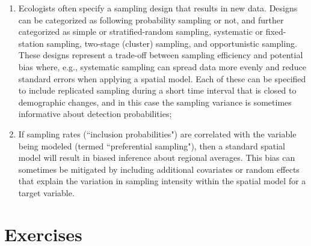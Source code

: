 \begin{enumerate}
    \item Ecologists often specify a sampling design that results in new data. Designs can be categorized as following probability sampling or not, and further categorized as simple or stratified-random sampling, systematic or fixed-station sampling, two-stage (cluster) sampling, and opportunistic sampling.  These designs represent a trade-off between sampling efficiency and potential bias where, e.g., systematic sampling can spread data more evenly and reduce standard errors when applying a spatial model.  Each of these can be specified to include replicated sampling during a short time interval that is closed to demographic changes, and in this case the sampling variance is sometimes informative about detection probabilities;

    \item If sampling rates (``inclusion probabilities") are correlated with the variable being modeled (termed ``preferential sampling"), then a standard spatial model will result in biased inference about regional averages.  This bias can sometimes be mitigated by including additional covariates or random effects that explain the variation in sampling intensity within the spatial model for a target variable.  
\end{enumerate}

\section{Exercises}

